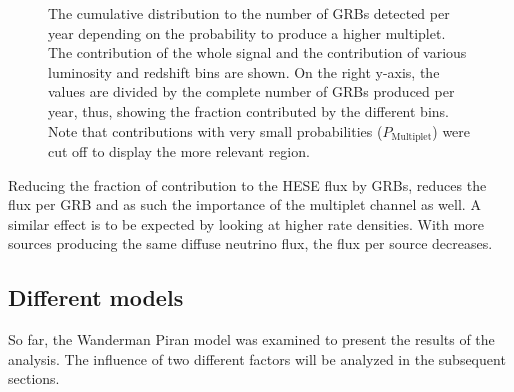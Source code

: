 \begin{figure}[h]
\centering
 \captionsetup{width=.9\textwidth}
\caption{The cumulative distribution to the number of GRBs detected 
per year depending on the probability to produce a higher multiplet. The 
contribution of the whole signal and the contribution of 
various luminosity and redshift bins are shown. On the right 
y-axis, the values are divided by the complete number of GRBs produced per 
year, thus, showing the fraction contributed by the different bins. Note that 
contributions with very small 
probabilities ($P_\mathrm{Multiplet}$) were cut off to display the more 
relevant region.}
\end{figure}

Reducing the fraction of contribution to the HESE flux by GRBs, reduces the 
flux per GRB and as such the importance of the multiplet channel as well. A 
similar effect is to be expected by looking at higher rate densities. With more 
sources producing the same diffuse neutrino flux, the flux per source decreases.


% 
% 
% 
% 



\subsection{Different models}
So far, the Wanderman Piran model was examined to present the results of the
analysis. The influence of two different factors will be analyzed in the 
subsequent sections. 

